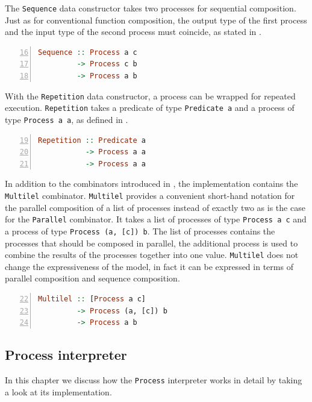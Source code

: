 The \texttt{Sequence} data constructor takes two processes for sequential composition. Just as for conventional function composition, the output type of the first process and the input type of the second process must coincide, as stated in .
\begin{lstlisting}[language=Haskell,caption=Signature of the \texttt{Seqeuence} data constructor.,numbers=left,frame=bt,firstnumber=16]
Sequence :: Process a c
         -> Process c b
         -> Process a b
\end{lstlisting}

With the \texttt{Repetition} data constructor, a process can be wrapped for repeated execution. \texttt{Repetition} takes a predicate of type \texttt{Predicate a} and a process of type \texttt{Process a a}, as defined in .
\begin{lstlisting}[language=Haskell,caption=Signature of the \texttt{Repetition} data constructor.,numbers=left,frame=bt,firstnumber=19]
Repetition :: Predicate a
           -> Process a a
           -> Process a a
\end{lstlisting}

In addition to the combinators introduced in , the implementation contains the \texttt{Multilel} combinator. \texttt{Multilel} provides a convenient short-hand notation for the parallel composition of a list of processes instead of exactly two as is the case for the \texttt{Parallel} combinator. It takes a list of processes of type \texttt{Process a c} and a process of type \texttt{Process (a, [c]) b}. The list of processes contains the processes that should be composed in parallel, the additional process is used to combine the results of the processes together into one value. \texttt{Multilel} does not change the expressiveness of the model, in fact it can be expressed in terms of parallel composition and sequence composition.
\begin{lstlisting}[language=Haskell,caption=Signature of the \texttt{Multilel} data constructor.,numbers=left,frame=bt,firstnumber=22]
Multilel :: [Process a c]
         -> Process (a, [c]) b
         -> Process a b
\end{lstlisting}

\subsection{Process interpreter}
In this chapter we discuss how the \texttt{Process} interpreter works in detail by taking a look at its implementation.

